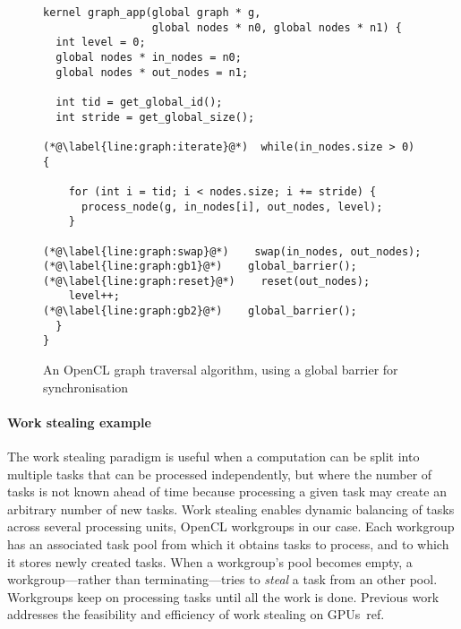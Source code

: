 \documentclass[numbers,nocopyrightspace,10pt]{sigplanconf}
\begin{document}
\begin{figure}

\begin{lstlisting}
kernel graph_app(global graph * g, 
                 global nodes * n0, global nodes * n1) {
  int level = 0;
  global nodes * in_nodes = n0;
  global nodes * out_nodes = n1;

  int tid = get_global_id();
  int stride = get_global_size();

(*@\label{line:graph:iterate}@*)  while(in_nodes.size > 0) {

    for (int i = tid; i < nodes.size; i += stride) {
      process_node(g, in_nodes[i], out_nodes, level);
    }

(*@\label{line:graph:swap}@*)    swap(in_nodes, out_nodes);
(*@\label{line:graph:gb1}@*)    global_barrier();
(*@\label{line:graph:reset}@*)    reset(out_nodes);
    level++;
(*@\label{line:graph:gb2}@*)    global_barrier();
  }
}
\end{lstlisting}
\caption{An OpenCL graph traversal algorithm, using a global barrier for synchronisation}\label{fig:graphsearch}
\end{figure}

\paragraph{Work stealing example}
%
The work stealing paradigm is useful when a computation can be split
into multiple tasks that can be processed independently, but where the
number of tasks is not known ahead of time because processing a given
task may create an arbitrary number of new tasks. Work stealing enables
dynamic balancing of tasks across several processing units, OpenCL
workgroups in our case. Each workgroup has an associated task pool from
which it obtains tasks to process, and to which it stores newly created
tasks. When a workgroup's pool becomes empty, a workgroup---rather than
terminating---tries to \emph{steal} a task from an other
pool. Workgroups keep on processing tasks until all the work is
done. Previous work addresses the feasibility and efficiency of work
stealing on GPUs~ref\cite{dlb-web,TPO10}.
\end{document}
